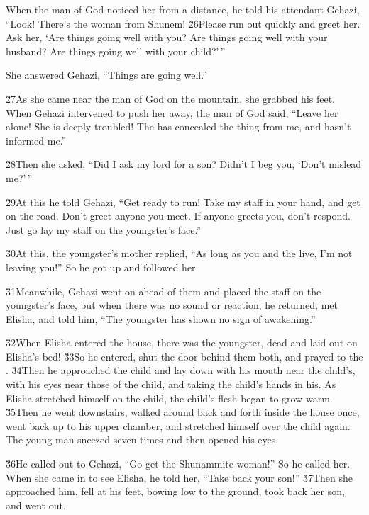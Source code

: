 When the man of God noticed her from a distance, he told his attendant Gehazi, ``Look! There's the woman from Shunem! \v{26}Please run out quickly and greet her. Ask her, `Are things going well with you? Are things going well with your husband? Are things going well with your child?'\,''

She answered Gehazi, ``Things are going well.''

\v{27}As she came near the man of God on the mountain, she grabbed his feet. When Gehazi intervened to push her away, the man of God said, ``Leave her alone! She is deeply troubled! The  has concealed the thing from me, and hasn't informed me.''

\v{28}Then she asked, ``Did I ask my lord for a son? Didn't I beg you, `Don't mislead me?'\,''

\v{29}At this he told Gehazi, ``Get ready to run! Take my staff in your hand, and get on the road. Don't greet anyone you meet. If anyone greets you, don't respond. Just go lay my staff on the youngster's face.''

\v{30}At this, the youngster's mother replied, ``As long as you and the  live, I'm not leaving you!'' So he got up and followed her.

\v{31}Meanwhile, Gehazi went on ahead of them and placed the staff on the youngster's face, but when there was no sound or reaction, he returned, met Elisha, and told him, ``The youngster has shown no sign of awakening.''

\v{32}When Elisha entered the house, there was the youngster, dead and laid out on Elisha's bed! \v{33}So he entered, shut the door behind them both, and prayed to the . \v{34}Then he approached the child and lay down with his mouth near the child's, with his eyes near those of the child, and taking the child's hands in his. As Elisha stretched himself on the child, the child's flesh began to grow warm. \v{35}Then he went downstairs, walked around back and forth inside the house once, went back up to his upper chamber, and stretched himself over the child again. The young man sneezed seven times and then opened his eyes.

\v{36}He called out to Gehazi, ``Go get the Shunammite woman!'' So he called her. When she came in to see Elisha, he told her, ``Take back your son!'' \v{37}Then she approached him, fell at his feet, bowing low to the ground, took back her son, and went out.

